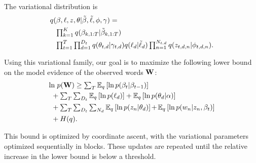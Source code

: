 The variational distribution is
\begin{align*}
  q(\beta, \ell, z, \theta | & \bv, \ellv, \phi, \gamma) = \nonumber \\
  & \hspace{-38pt} \textstyle \prod_{k=1}^K q(\beta_{k,1:T} | \bv_{k,1:T}) \nonumber \\
  & \hspace{-38pt} \textstyle \prod_{t=1}^T \prod_{d=1}^{D_t} q(\theta_{t,d} | \gamma_{t,d})
  q(\ell_{d} | \ellv_{d})
  \textstyle \prod_{n=1}^{N_{t,d}} q(z_{t,d,n} | \vphi_{t,d,n}). \nonumber \\ %
\end{align*}


\vspace{-5pt}
Using this variational family, our goal is to maximize the following
lower bound on the model evidence of the observed words $\textbf{W}$:
\begin{align*}
 \hspace{-0pt} \ln & \textstyle \hspace{3pt} p(\textbf{W}) \geq \textstyle \sum_T \mathbb{E}_q\left[\ln p(\beta_{t} | \beta_{t-1})\right] \nonumber \\
 & \hspace{-5pt} + \textstyle \sum_{T} \textstyle \sum_{D_t} \mathbb{E}_q\left[\ln p(\ell_{d})\right] + \mathbb{E}_q\left[\ln p(\theta_{d} | \alpha)\right] \nonumber \\
 & \hspace{-5pt} + \textstyle \sum_{T} \textstyle \sum_{D_t} \textstyle \sum_{N_d} \mathbb{E}_q\left[\ln p( z_n | \theta_d)\right] \hspace{-1pt} + \hspace{-1pt} \mathbb{E}_q\left[\ln p(w_n | z_n, \beta_t)\right] \\
 & \hspace{-5pt} + H(q). \nonumber \\
  \label{eq:elbo}
\end{align*}

\vspace{-20pt}
This bound is optimized by coordinate ascent, with the variational
parameters optimized sequentially in blocks.  These updates are
repeated until the relative increase in the lower bound is below a
threshold.

